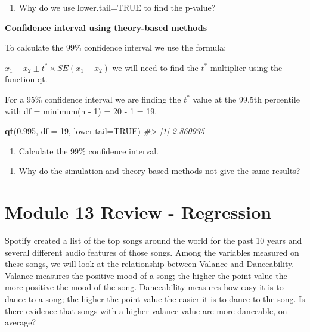 \documentclass[
]{report}
\newenvironment{Shaded}{\begin{snugshade}}{\end{snugshade}}
\newcommand{\AttributeTok}[1]{\textcolor[rgb]{0.13,0.29,0.53}{#1}}
\newcommand{\CommentTok}[1]{\textcolor[rgb]{0.56,0.35,0.01}{\textit{#1}}}
\newcommand{\ConstantTok}[1]{\textcolor[rgb]{0.56,0.35,0.01}{#1}}
\newcommand{\DecValTok}[1]{\textcolor[rgb]{0.00,0.00,0.81}{#1}}
\newcommand{\FloatTok}[1]{\textcolor[rgb]{0.00,0.00,0.81}{#1}}
\newcommand{\FunctionTok}[1]{\textcolor[rgb]{0.13,0.29,0.53}{\textbf{#1}}}
\newcommand{\NormalTok}[1]{#1}
\providecommand{\tightlist}{%
  \setlength{\itemsep}{0pt}\setlength{\parskip}{0pt}}
\begin{document}
\begin{enumerate}
\def\labelenumi{\arabic{enumi}.}
\setcounter{enumi}{9}
\tightlist
\item
  Why do we use lower.tail=TRUE to find the p-value?
  \vspace{0.5in}
\end{enumerate}

\textbf{Confidence interval using theory-based methods}

To calculate the 99\% confidence interval we use the formula:

\(\bar{x}_1- \bar{x}_2\pm t^* \times SE(\bar{x}_1- \bar{x}_2)\) we will need to find the \(t^*\) multiplier using the function qt.

For a 95\% confidence interval we are finding the \(t^*\) value at the 99.5th percentile with df = minimum(n - 1) = 20 - 1 = 19.

\begin{Shaded}
\begin{Highlighting}[]
\FunctionTok{qt}\NormalTok{(}\FloatTok{0.995}\NormalTok{, }\AttributeTok{df =} \DecValTok{19}\NormalTok{, }\AttributeTok{lower.tail=}\ConstantTok{TRUE}\NormalTok{)}
\CommentTok{\#\textgreater{} [1] 2.860935}
\end{Highlighting}
\end{Shaded}

\begin{enumerate}
\def\labelenumi{\arabic{enumi}.}
\setcounter{enumi}{10}
\tightlist
\item
  Calculate the 99\% confidence interval.
\end{enumerate}

\vspace{0.5in}

\begin{enumerate}
\def\labelenumi{\arabic{enumi}.}
\setcounter{enumi}{11}
\tightlist
\item
  Why do the simulation and theory based methods not give the same results?
\end{enumerate}

\vspace{0.5in}

\newpage

\section{Module 13 Review - Regression}\label{module-13-review---regression}

Spotify created a list of the top songs around the world for the past 10 years and several different audio features of those songs. Among the variables measured on these songs, we will look at the relationship between Valance and Danceability. Valance measures the positive mood of a song; the higher the point value the more positive the mood of the song. Danceability measures how easy it is to dance to a song; the higher the point value the easier it is to dance to the song. Is there evidence that songs with a higher valance value are more danceable, on average?
\end{document}
